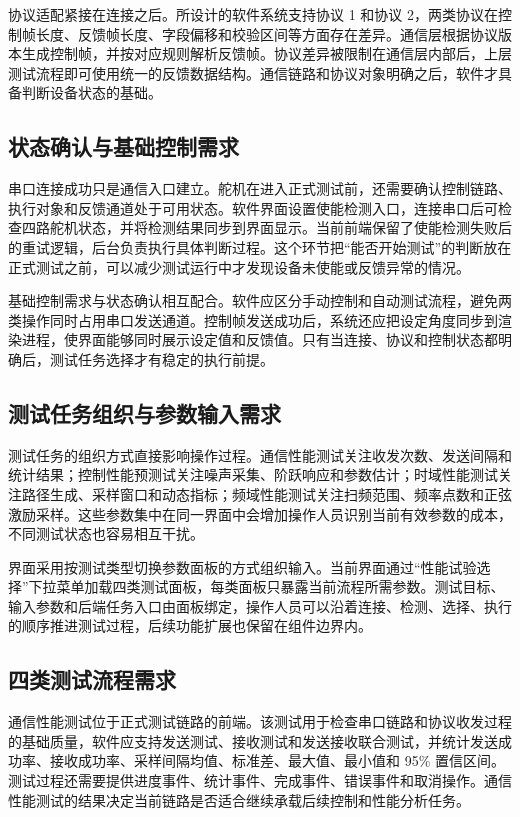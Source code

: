 协议适配紧接在连接之后。所设计的软件系统支持协议 1 和协议 2，两类协议在控制帧长度、反馈帧长度、字段偏移和校验区间等方面存在差异。通信层根据协议版本生成控制帧，并按对应规则解析反馈帧。协议差异被限制在通信层内部后，上层测试流程即可使用统一的反馈数据结构。通信链路和协议对象明确之后，软件才具备判断设备状态的基础。

\subsection{状态确认与基础控制需求}

串口连接成功只是通信入口建立。舵机在进入正式测试前，还需要确认控制链路、执行对象和反馈通道处于可用状态。软件界面设置使能检测入口，连接串口后可检查四路舵机状态，并将检测结果同步到界面显示。当前前端保留了使能检测失败后的重试逻辑，后台负责执行具体判断过程。这个环节把“能否开始测试”的判断放在正式测试之前，可以减少测试运行中才发现设备未使能或反馈异常的情况。

基础控制需求与状态确认相互配合。软件应区分手动控制和自动测试流程，避免两类操作同时占用串口发送通道。控制帧发送成功后，系统还应把设定角度同步到渲染进程，使界面能够同时展示设定值和反馈值。只有当连接、协议和控制状态都明确后，测试任务选择才有稳定的执行前提。

\subsection{测试任务组织与参数输入需求}

测试任务的组织方式直接影响操作过程。通信性能测试关注收发次数、发送间隔和统计结果；控制性能预测试关注噪声采集、阶跃响应和参数估计；时域性能测试关注路径生成、采样窗口和动态指标；频域性能测试关注扫频范围、频率点数和正弦激励采样。这些参数集中在同一界面中会增加操作人员识别当前有效参数的成本，不同测试状态也容易相互干扰。

界面采用按测试类型切换参数面板的方式组织输入。当前界面通过“性能试验选择”下拉菜单加载四类测试面板，每类面板只暴露当前流程所需参数。测试目标、输入参数和后端任务入口由面板绑定，操作人员可以沿着连接、检测、选择、执行的顺序推进测试过程，后续功能扩展也保留在组件边界内。

\subsection{四类测试流程需求}

通信性能测试位于正式测试链路的前端。该测试用于检查串口链路和协议收发过程的基础质量，软件应支持发送测试、接收测试和发送接收联合测试，并统计发送成功率、接收成功率、采样间隔均值、标准差、最大值、最小值和 95\% 置信区间。测试过程还需要提供进度事件、统计事件、完成事件、错误事件和取消操作。通信性能测试的结果决定当前链路是否适合继续承载后续控制和性能分析任务。

